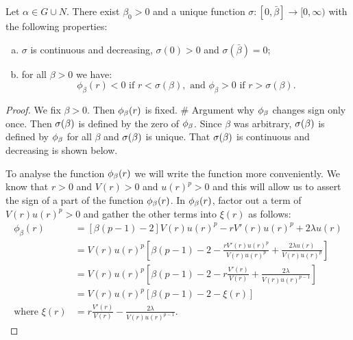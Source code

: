 \begin{lemma}\label{genlem4}
Let $\alpha\in G\cup N$. There exist $\beta_0>0$ and a unique function
$\sigma:[0,\bar\beta]\to[0,\infty)$ with the following properties:
\begin{enumerate}[(a)]
\item  $\sigma$ is continuous and decreasing, $\sigma(0)>0$ and
$\sigma(\bar\beta)=0$; \item for all $\beta>0$ we have: 
\[\phi_\beta(r)<0\text{ if }r<\sigma(\beta),\text{ and }
\phi_\beta>0\text{ if }r>\sigma(\beta). \]
\end{enumerate}
\end{lemma}
\begin{proof}
We fix $\beta>0$. Then $\phi_{\beta}(r)$ is fixed. 
\# Argument why $\phi_{\beta}$ changes sign only once.  
Then $\sigma(\beta)$ is defined by the zero of $\phi_{\beta}$.  Since $\beta$ was arbitrary,
$\sigma(\beta)$ is defined by $\phi_{\beta}$ for all $\beta$ and $\sigma(\beta)$ is unique.  That $\sigma(\beta)$
is continuous and decreasing is shown below.


To analyse the function $\phi_{\beta}(r)$ we will write the function more conveniently.
We know that $r>0$ and $V(r)>0$ and $u(r)^p>0$ and this will allow us to assert
the sign of a part of the function $\phi_{\beta}(r)$. In $\phi_{\beta}(r)$, factor out a term
of $V(r)u(r)^p>0$ and gather the other terms into $\xi(r)$ as follows:
\begin{align*}
\phi_{\beta}(r)&=\left[\beta(p-1)-2\right]V(r)u(r)^p-rV'(r)u(r)^p+
2\lambda u(r) \\
&=V(r)u(r)^p\left[\beta(p-1)-2-\frac{rV'(r)u(r)^p}{V(r)u(r)^p}+
\frac{2\lambda u(r)}{V(r)u(r)^p}\right]\\
&=V(r)u(r)^p\left[\beta(p-1)-2-r\frac{V'(r)}{V(r)}+
\frac{2\lambda}{V(r)u(r)^{p-1}}\right]\\
&= V(r)u(r)^p\left[\beta(p-1)-2-\xi(r)\right]\\ 
\text{where }\xi(r)&=r\frac{V'(r)}{V(r)}-\frac{2\lambda}{V(r)u(r)^{p-1}}.  
\end{align*}


\end{proof}
